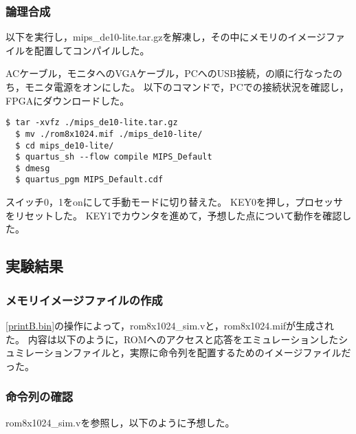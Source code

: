 \subsubsection{論理合成}
以下を実行し，mips\_de10-lite.tar.gzを解凍し，その中にメモリのイメージファイルを配置してコンパイルした。

ACケーブル，モニタへのVGAケーブル，PCへのUSB接続，の順に行なったのち，モニタ電源をオンにした。
以下のコマンドで，PCでの接続状況を確認し，FPGAにダウンロードした。
\begin{lstlisting}[caption={論理合成操作},label={論理合成操作1-1}]
  $ tar -xvfz ./mips_de10-lite.tar.gz
  $ mv ./rom8x1024.mif ./mips_de10-lite/
  $ cd mips_de10-lite/
  $ quartus_sh --flow compile MIPS_Default
  $ dmesg
  $ quartus_pgm MIPS_Default.cdf
\end{lstlisting}

スイッチ0，1をonにして手動モードに切り替えた。
KEY0を押し，プロセッサをリセットした。
KEY1でカウンタを進めて，予想した点について動作を確認した。

\subsection{実験結果}
\subsubsection{メモリイメージファイルの作成}
\ref{printB.bin}の操作によって，rom8x1024\_sim.vと，rom8x1024.mifが生成された。
内容は以下のように，ROMへのアクセスと応答をエミュレーションしたシュミレーションファイルと，実際に命令列を配置するためのイメージファイルだった。

\subsubsection{命令列の確認}
rom8x1024\_sim.vを参照し，以下のように予想した。

